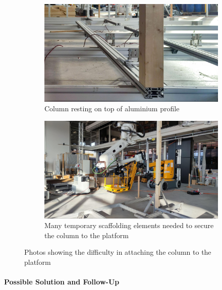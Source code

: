 \begin{figure}[!h]
    \centering
    \begin{subfigure}[b]{0.49\textwidth}
        \centering
        \includegraphics[width=\textwidth]{images/6b/img16.jpg}
        \caption{Column resting on top of aluminium profile}
        \label{fig:column-resting-difficulty}
    \end{subfigure}
    \hfill
    \begin{subfigure}[b]{0.49\textwidth}
        \centering
        \includegraphics[width=\textwidth]{images/6b/img17.jpg}
        \caption{Many temporary scaffolding elements needed to secure the column to the platform}
        \label{fig:temporary-scaffolding-needed-column-bottom}
    \end{subfigure}
    \caption{Photos showing the difficulty in attaching the column to the platform}
    \label{fig:column-attachment-difficulty}
\end{figure}

\paragraph{Possible Solution and Follow-Up}

